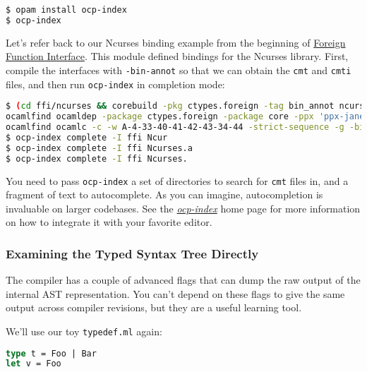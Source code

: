 \begin{lstlisting}[language=bash]
$ opam install ocp-index
$ ocp-index
\end{lstlisting}

Let's refer back to our Ncurses binding example from the beginning of
\href{foreign-function-interface.html\#foreign-function-interface}{Foreign
Function Interface}. This module defined bindings for the Ncurses
library. First, compile the interfaces with
\passthrough{\lstinline!-bin-annot!} so that we can obtain the
\passthrough{\lstinline!cmt!} and \passthrough{\lstinline!cmti!} files,
and then run \passthrough{\lstinline!ocp-index!} in completion mode:

\begin{lstlisting}[language=bash]
$ (cd ffi/ncurses && corebuild -pkg ctypes.foreign -tag bin_annot ncurses.cmi)
ocamlfind ocamldep -package ctypes.foreign -package core -ppx 'ppx-jane -as-ppx' -modules ncurses.mli > ncurses.mli.depends
ocamlfind ocamlc -c -w A-4-33-40-41-42-43-34-44 -strict-sequence -g -bin-annot -short-paths -thread -package ctypes.foreign -package core -ppx 'ppx-jane -as-ppx' -o ncurses.cmi ncurses.mli
$ ocp-index complete -I ffi Ncur
$ ocp-index complete -I ffi Ncurses.a
$ ocp-index complete -I ffi Ncurses.
\end{lstlisting}

You need to pass \passthrough{\lstinline!ocp-index!} a set of
directories to search for \passthrough{\lstinline!cmt!} files in, and a
fragment of text to autocomplete. As you can imagine, autocompletion is
invaluable on larger codebases. See the
\href{https://github.com/ocamlpro/ocp-index}{\emph{ocp-index}} home page
for more information on how to integrate it with your favorite editor.

\hypertarget{examining-the-typed-syntax-tree-directly}{%
\subsubsection{Examining the Typed Syntax Tree
Directly}\label{examining-the-typed-syntax-tree-directly}}

The compiler has a couple of advanced flags that can dump the raw output
of the internal AST representation. You can't depend on these flags to
give the same output across compiler revisions, but they are a useful
learning tool.

We'll use our toy \passthrough{\lstinline!typedef.ml!} again:

\begin{lstlisting}[language=Caml]
type t = Foo | Bar
let v = Foo
\end{lstlisting}


